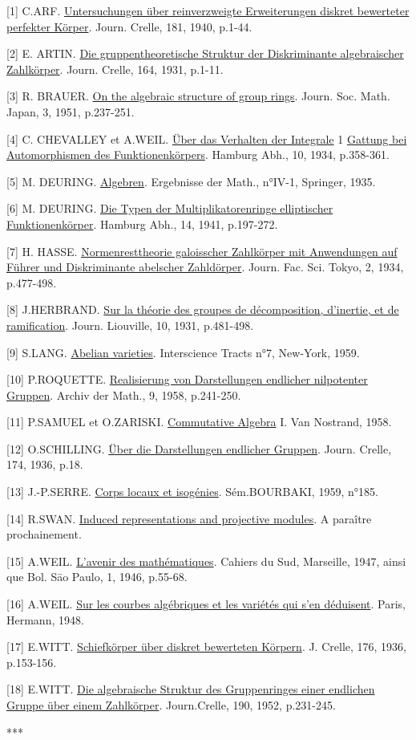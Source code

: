 \begin{center}\end{center}

[1] C.ARF. \uline{Untersuchungen über reinverzweigte Erweiterungen diskret bewerteter perfekter Körper}. Journ. Crelle, 181, 1940, p.1-44.

[2] E. ARTIN. \uline{Die gruppentheoretische Struktur der Diskriminante algebraischer Zahlkörper}. Journ. Crelle, 164, 1931, p.1-11.

[3] R. BRAUER. \uline{On the algebraic structure of group rings}. Journ. Soc. Math. Japan, 3, 1951, p.237-251.

[4] C. CHEVALLEY et A.WEIL. \uline{Über das Verhalten der Integrale} 1 \uline{Gattung bei Automorphismen des Funktionenkörpers}. Hamburg Abh., 10, 1934, p.358-361.

[5] M. DEURING. \uline{Algebren}. Ergebnisse der Math., n°IV-1, Springer, 1935.

[6] M. DEURING. \uline{Die Typen der Multiplikatorenringe elliptischer Funktionenkörper}. Hamburg Abh., 14, 1941, p.197-272.

[7] H. HASSE. \uline{Normenresttheorie galoisscher Zahlkörper mit Anwendungen auf Führer und Diskriminante abelscher Zahldörper}. Journ. Fac. Sci. Tokyo, 2, 1934, p.477-498.

[8] J.HERBRAND. \uline{Sur la théorie des groupes de décomposition, d'inertie, et de ramification}. Journ. Liouville, 10, 1931, p.481-498.

[9] S.LANG. \uline{Abelian varieties}. Interscience Tracts n°7, New-York, 1959.

[10] P.ROQUETTE. \uline{Realisierung von Darstellungen endlicher nilpotenter Gruppen}. Archiv der Math., 9, 1958, p.241-250.

[11] P.SAMUEL et O.ZARISKI. \uline{Commutative Algebra} I. Van Nostrand, 1958.

[12] O.SCHILLING. \uline{Über die Darstellungen endlicher Gruppen}. Journ. Crelle, 174, 1936, p.18.

[13] J.-P.SERRE. \uline{Corps locaux et isogénies}. Sém.BOURBAKI, 1959, n°185.

[14] R.SWAN. \uline{Induced representations and projective modules}. A paraître prochainement.

[15] A.WEIL. \uline{L'avenir des mathématiques}. Cahiers du Sud, Marseille, 1947, ainsi que Bol. S\={a}o Paulo, 1, 1946, p.55-68.

[16] A.WEIL. \uline{Sur les courbes algébriques et les variétés qui s'en déduisent}. Paris, Hermann, 1948.

[17] E.WITT. \uline{Schiefkörper über diskret bewerteten Körpern}. J. Crelle, 176, 1936, p.153-156.

[18] E.WITT. \uline{Die algebraische Struktur des Gruppenringes einer endlichen Gruppe über einem Zahlkörper}. Journ.Crelle, 190, 1952, p.231-245.

\begin{center}***\end{center}
